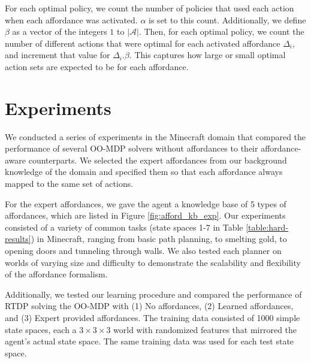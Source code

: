 \documentclass[conference]{IEEEtran}
\begin{document}
For each optimal policy, we count the number of policies that used each action 
when each affordance was activated. $\alpha$ is set to this count. Additionally, we define $\beta$ as a vector of the integers $1$ to $|\mathcal{A}|$.
Then, for each optimal policy, we count the number of different actions that were optimal for each activated affordance $\Delta_i$, and increment
that value for $\Delta_i.\beta$. This captures how large or small optimal action sets are expected to be for each affordance.

\section{Experiments}
\label{sec:experiments}

We conducted a series of experiments in the Minecraft domain that
compared the performance of several OO-MDP solvers without affordances
to their affordance-aware counterparts. We selected the expert
affordances from our background knowledge of the domain and specified them 
so that each affordance always mapped to the same set of actions.

For the expert affordances, we gave the agent a knowledge base of 5 types of affordances,
which are listed in Figure \ref{fig:afford_kb_exp}.  Our experiments
consisted of a variety of common tasks (state spaces 1-7 in Table \ref{table:hard-results}) in Minecraft, ranging from
basic path planning, to smelting gold, to opening doors and tunneling
through walls.  We also tested each planner on worlds of varying size
and difficulty to demonstrate the scalability and flexibility of the
affordance formalism. 

Additionally, we tested our learning procedure and compared the performance of RTDP solving the OO-MDP
with (1) No affordances, (2) Learned affordances, and (3) Expert provided affordances. The training data consisted of 1000 simple state
spaces, each a $3\times3\times3$ world with randomized features that mirrored the agent's actual state space. The same training data was used
for each test state space.
\end{document}
